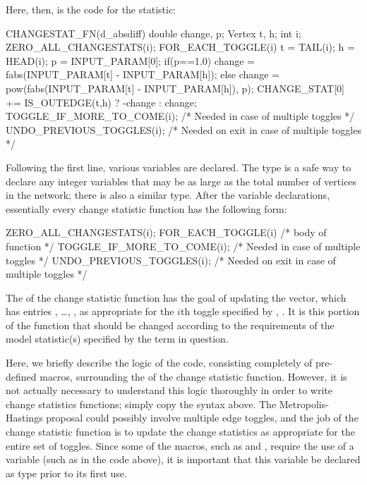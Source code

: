 \documentclass[nojss]{jss}
\begin{document}
Here, then, is the code for the  statistic:
\begin{CodeChunk}
\begin{CodeInput}
CHANGESTAT_FN(d_absdiff) {
  double change, p; Vertex t, h; int i;
  ZERO_ALL_CHANGESTATS(i);
  FOR_EACH_TOGGLE(i) {
    t = TAIL(i); h = HEAD(i);
    p = INPUT_PARAM[0];
    if(p==1.0){
      change = fabs(INPUT_PARAM[t] - INPUT_PARAM[h]);
    }else{
      change = pow(fabs(INPUT_PARAM[t] - INPUT_PARAM[h]), p);
    }
    CHANGE_STAT[0] += IS_OUTEDGE(t,h) ? -change : change;
    TOGGLE_IF_MORE_TO_COME(i); /* Needed in case of multiple toggles */
  }
  UNDO_PREVIOUS_TOGGLES(i); /* Needed on exit in case of multiple toggles */
}
\end{CodeInput}
\end{CodeChunk}
Following the first line, various variables are declared.  The  type
is a safe way to declare any integer variables that may be as large as the total number of
vertices in the network; there is also a similar  type.
After the variable declarations, essentially every change statistic function has the following
form:
\begin{CodeChunk}
\begin{CodeInput}
  ZERO_ALL_CHANGESTATS(i);
  FOR_EACH_TOGGLE(i) {
    /* body of function */
    TOGGLE_IF_MORE_TO_COME(i); /* Needed in case of multiple toggles */
  }
  UNDO_PREVIOUS_TOGGLES(i); /* Needed on exit in case of multiple toggles */
\end{CodeInput}
\end{CodeChunk}
The  of the change statistic function has the goal of
updating the  vector, which has entries
, \ldots,
,
as appropriate for the $i$th toggle specified by
, .  It is this portion of the function that should
be changed according to the requirements of the model statistic(s) specified by 
the term in question.  

Here, we briefly describe the logic of the code, consisting completely of
pre-defined macros, surrounding the  of the change statistic function.
However, it is not actually necessary to understand this logic thoroughly in order to
write change statistics functions; simply copy the syntax above.
The Metropolis-Hastings proposal could possibly involve
multiple edge toggles, and the job of the change statistic function is to update the
change statistics as appropriate for the entire set of toggles.
Since some of the macros, such as  and
,
 require the use of a variable (such as  in the code above), it is important
 that this variable be declared as type  prior to its first use.
\end{document}
